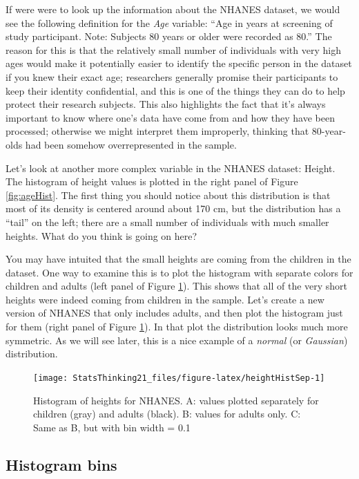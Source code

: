 \documentclass[
  12pt,
]{book}
\begin{document}
If were were to look up the information about the NHANES dataset, we would see the following definition for the \emph{Age} variable: ``Age in years at screening of study participant. Note: Subjects 80 years or older were recorded as 80.'' The reason for this is that the relatively small number of individuals with very high ages would make it potentially easier to identify the specific person in the dataset if you knew their exact age; researchers generally promise their participants to keep their identity confidential, and this is one of the things they can do to help protect their research subjects. This also highlights the fact that it's always important to know where one's data have come from and how they have been processed; otherwise we might interpret them improperly, thinking that 80-year-olds had been somehow overrepresented in the sample.

Let's look at another more complex variable in the NHANES dataset: Height. The histogram of height values is plotted in the right panel of Figure \ref{fig:ageHist}. The first thing you should notice about this distribution is that most of its density is centered around about 170 cm, but the distribution has a ``tail'' on the left; there are a small number of individuals with much smaller heights. What do you think is going on here?

You may have intuited that the small heights are coming from the children in the dataset. One way to examine this is to plot the histogram with separate colors for children and adults (left panel of Figure \ref{fig:heightHistSep}). This shows that all of the very short heights were indeed coming from children in the sample. Let's create a new version of NHANES that only includes adults, and then plot the histogram just for them (right panel of Figure \ref{fig:heightHistSep}). In that plot the distribution looks much more symmetric. As we will see later, this is a nice example of a \emph{normal} (or \emph{Gaussian}) distribution.

\begin{figure}
\texttt{[image: StatsThinking21\_files/figure-latex/heightHistSep-1]} \caption{Histogram of heights for NHANES. A: values plotted separately for children (gray) and adults (black).  B: values for adults only. C: Same as B, but with bin width = 0.1}\label{fig:heightHistSep}
\end{figure}

\hypertarget{histogram-bins}{%
\subsection{Histogram bins}\label{histogram-bins}}
\end{document}
